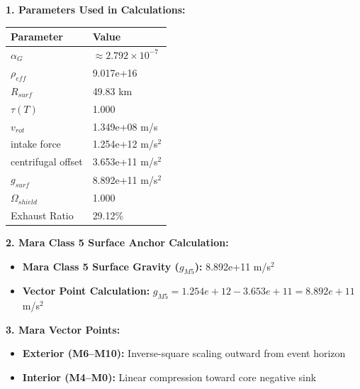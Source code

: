 \documentclass[11pt, a4paper]{article}
\begin{document}
\vspace{0.5em}
\noindent \textbf{1. Parameters Used in Calculations:}
\begin{center}
  \begin{tabular}{|l|l|}
    \hline
    \textbf{Parameter} & \textbf{Value} \\ \hline
    $\alpha_G$ & $\approx 2.792 \times 10^{-7}$ \\ \hline
    $\rho_{eff}$ & 9.017e+16 \\ \hline
    $R_{surf}$ & 49.83 km \\ \hline
    $\tau(T)$ & 1.000 \\ \hline
    $v_{rot}$ & 1.349e+08 m/s \\ \hline
    intake force & 1.254e+12 m/s$^2$ \\ \hline
    centrifugal offset & 3.653e+11 m/s$^2$ \\ \hline
    $g_{surf}$ & 8.892e+11 m/s$^2$ \\ \hline
    $\Omega_{shield}$ & 1.000 \\ \hline
    Exhaust Ratio & 29.12\% \\ \hline
  \end{tabular}
\end{center}

\vspace{0.5em}
\noindent \textbf{2. Mara Class 5 Surface Anchor Calculation:}
\begin{itemize}
  \item \textbf{Mara Class 5 Surface Gravity ($g_{M5}$):} 8.892e+11 m/s$^2$
  \item \textbf{Vector Point Calculation:} $g_{M5} = 1.254e+12 - 3.653e+11 = 8.892e+11$ m/s$^2$
\end{itemize}

\vspace{0.5em}
\noindent \textbf{3. Mara Vector Points:}
\begin{itemize}
  \item \textbf{Exterior (M6--M10):} Inverse-square scaling outward from event horizon
  \item \textbf{Interior (M4--M0):} Linear compression toward core negative sink
\end{itemize}
\end{document}
